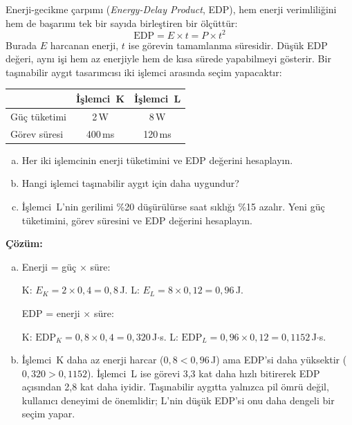 \begin{ornek}[2.14]
\label{orn:edp}
Enerji-gecikme çarpımı (\emph{Energy-Delay Product}, EDP), hem enerji verimliliğini hem de başarımı tek bir sayıda birleştiren bir ölçüttür:
\[
\text{EDP} = E \times t = P \times t^2
\]
Burada $E$ harcanan enerji, $t$ ise görevin tamamlanma süresidir. Düşük EDP değeri, aynı işi hem az enerjiyle hem de kısa sürede yapabilmeyi gösterir. Bir taşınabilir aygıt tasarımcısı iki işlemci arasında seçim yapacaktır:

\begin{center}
\small
\begin{tabular}{lcc}
\toprule
& \textbf{İşlemci~K} & \textbf{İşlemci~L} \\
\midrule
Güç tüketimi & 2\,W & 8\,W \\
Görev süresi & 400\,ms & 120\,ms \\
\bottomrule
\end{tabular}
\end{center}

\begin{enumerate}[(a)]
    \item Her iki işlemcinin enerji tüketimini ve EDP değerini hesaplayın.
    \item Hangi işlemci taşınabilir aygıt için daha uygundur?
    \item İşlemci~L'nin gerilimi \%20 düşürülürse saat sıklığı \%15 azalır. Yeni güç tüketimini, görev süresini ve EDP değerini hesaplayın.
\end{enumerate}

\textbf{Çözüm:}

\begin{enumerate}[(a)]
    \item Enerji = güç $\times$ süre:

    K: $E_K = 2 \times 0{,}4 = 0{,}8$\,J. \quad L: $E_L = 8 \times 0{,}12 = 0{,}96$\,J.

    EDP = enerji $\times$ süre:

    K: $\text{EDP}_K = 0{,}8 \times 0{,}4 = 0{,}320$\,J$\cdot$s. \quad L: $\text{EDP}_L = 0{,}96 \times 0{,}12 = 0{,}1152$\,J$\cdot$s.

    \item İşlemci~K daha az enerji harcar ($0{,}8 < 0{,}96$\,J) ama EDP'si daha yüksektir ($0{,}320 > 0{,}1152$). İşlemci~L ise görevi 3,3 kat daha hızlı bitirerek EDP açısından 2,8 kat daha iyidir. Taşınabilir aygıtta yalnızca pil ömrü değil, kullanıcı deneyimi de önemlidir; L'nin düşük EDP'si onu daha dengeli bir seçim yapar.


\end{enumerate}
\end{ornek}
